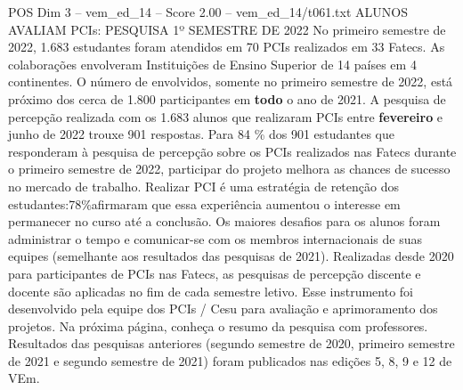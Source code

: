 \begin{textsample}{POS Dim 3 – vem\_ed\_14 – Score 2.00 – vem\_ed\_14/t061.txt}  \label{ex:f3_pos_032}
ALUNOS AVALIAM PCIs: PESQUISA 1º SEMESTRE DE 2022 No primeiro semestre de 2022, 1.683 estudantes foram atendidos em 70 PCIs realizados em 33 Fatecs.
As colaborações envolveram Instituições de Ensino Superior de 14 países em 4 continentes.
O número de envolvidos, somente no primeiro semestre de 2022, está próximo dos cerca de 1.800 participantes em \textbf{todo} o ano de 2021.
A pesquisa de percepção realizada com os 1.683 alunos que realizaram PCIs entre \textbf{fevereiro} e junho de 2022 trouxe 901 respostas.
Para 84 \% dos 901 estudantes que responderam à pesquisa de percepção sobre os PCIs realizados nas Fatecs durante o primeiro semestre de 2022, participar do projeto melhora as chances de sucesso no mercado de trabalho.
Realizar PCI é uma estratégia de retenção dos estudantes:78\%afirmaram que essa experiência aumentou o interesse em permanecer no curso até a conclusão.
Os maiores desafios para os alunos foram administrar o tempo e comunicar-se com os membros internacionais de suas equipes (semelhante aos resultados das pesquisas de 2021).
Realizadas desde 2020 para participantes de PCIs nas Fatecs, as pesquisas de percepção discente e docente são aplicadas no fim de cada semestre letivo.
Esse instrumento foi desenvolvido pela equipe dos PCIs / Cesu para avaliação e aprimoramento dos projetos.
Na próxima página, conheça o resumo da pesquisa com professores.
Resultados das pesquisas anteriores (segundo semestre de 2020, primeiro semestre de 2021 e segundo semestre de 2021) foram publicados nas edições 5, 8, 9 e 12 de VEm.

\end{textsample}
